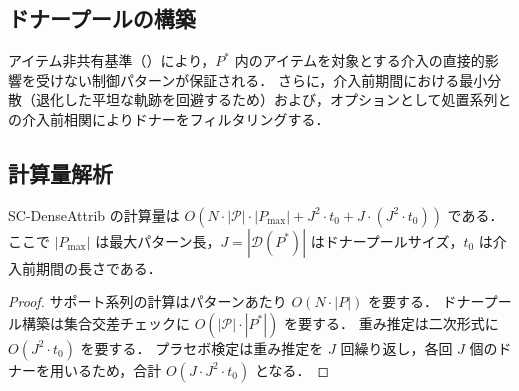 \subsection{ドナープールの構築}

アイテム非共有基準（）により，$P^*$ 内のアイテムを対象とする介入の直接的影響を受けない制御パターンが保証される．
さらに，介入前期間における最小分散（退化した平坦な軌跡を回避するため）および，オプションとして処置系列との介入前相関によりドナーをフィルタリングする．

\subsection{計算量解析}

\begin{theorem}[計算量]
\label{thm:complexity}
SC-DenseAttrib の計算量は $O(N \cdot |\mathcal{P}| \cdot |P_{\max}| + J^2 \cdot t_0 + J \cdot (J^2 \cdot t_0))$ である．ここで $|P_{\max}|$ は最大パターン長，$J = |\mathcal{D}(P^*)|$ はドナープールサイズ，$t_0$ は介入前期間の長さである．
\end{theorem}

\begin{proof}
サポート系列の計算はパターンあたり $O(N \cdot |P|)$ を要する．
ドナープール構築は集合交差チェックに $O(|\mathcal{P}| \cdot |P^*|)$ を要する．
重み推定は二次形式に $O(J^2 \cdot t_0)$ を要する．
プラセボ検定は重み推定を $J$ 回繰り返し，各回 $J$ 個のドナーを用いるため，合計 $O(J \cdot J^2 \cdot t_0)$ となる．
\end{proof}
